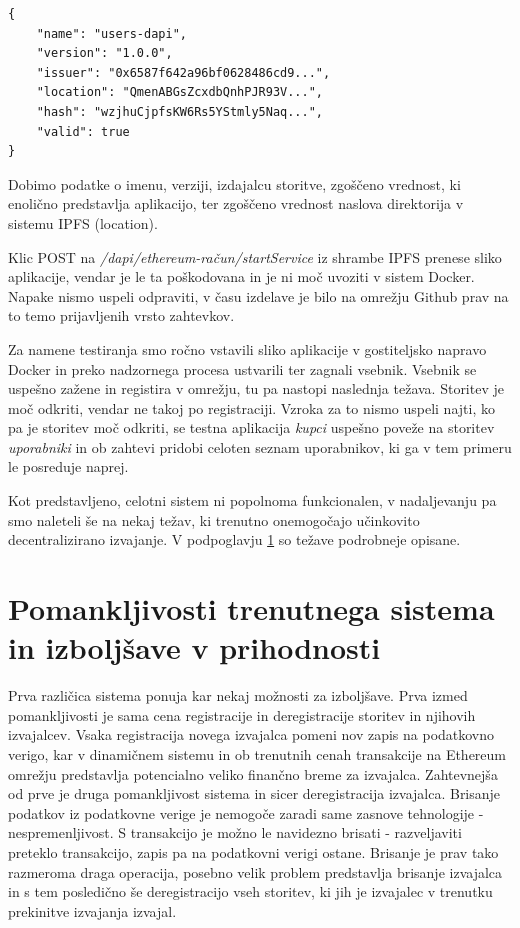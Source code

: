 \documentclass[a4paper, 12pt]{book}
\begin{document}
\begin{lstlisting}
{
	"name": "users-dapi",
	"version": "1.0.0",
	"issuer": "0x6587f642a96bf0628486cd9...",
	"location": "QmenABGsZcxdbQnhPJR93V...",
	"hash": "wzjhuCjpfsKW6Rs5YStmly5Naq...",
	"valid": true
}	
\end{lstlisting}

Dobimo podatke o imenu, verziji, izdajalcu storitve, zgoščeno vrednost, ki enolično predstavlja aplikacijo, ter zgoščeno vrednost naslova direktorija v sistemu IPFS (location).

Klic POST na \textit{/dapi/{ethereum-račun}/startService} iz shrambe IPFS prenese sliko aplikacije, vendar je le ta poškodovana in je ni moč uvoziti v sistem Docker.
Napake nismo uspeli odpraviti, v času izdelave je bilo na omrežju Github prav na to temo prijavljenih vrsto zahtevkov.

Za namene testiranja smo ročno vstavili sliko aplikacije v gostiteljsko napravo Docker in preko nadzornega procesa ustvarili ter zagnali vsebnik.
Vsebnik se uspešno zažene in registira v omrežju, tu pa nastopi naslednja težava.
Storitev je moč odkriti, vendar ne takoj po registraciji.
Vzroka za to nismo uspeli najti, ko pa je storitev moč odkriti, se testna aplikacija \textit{kupci} uspešno poveže na storitev \textit{uporabniki} in ob zahtevi pridobi celoten seznam uporabnikov, ki ga v tem primeru le posreduje naprej.

Kot predstavljeno, celotni sistem ni popolnoma funkcionalen, v nadaljevanju pa smo naleteli še na nekaj težav, ki trenutno onemogočajo učinkovito decentralizirano izvajanje.
V podpoglavju \ref{improvments} so težave podrobneje opisane.


\section{Pomankljivosti trenutnega sistema in izboljšave v prihodnosti}
\label{improvments}

Prva različica sistema ponuja kar nekaj možnosti za izboljšave.
Prva izmed pomankljivosti je sama cena registracije in deregistracije storitev in njihovih izvajalcev.
Vsaka registracija novega izvajalca pomeni nov zapis na podatkovno verigo, kar v dinamičnem sistemu in ob trenutnih cenah transakcije na Ethereum omrežju predstavlja potencialno veliko finančno breme za izvajalca.
Zahtevnejša od prve je druga pomankljivost sistema in sicer deregistracija izvajalca.
Brisanje podatkov iz podatkovne verige je nemogoče zaradi same zasnove tehnologije - nespremenljivost.
S transakcijo je možno le navidezno brisati - razveljaviti preteklo transakcijo, zapis pa na podatkovni verigi ostane.
Brisanje je prav tako razmeroma draga operacija, posebno velik problem predstavlja brisanje izvajalca in s tem posledično še deregistracijo vseh storitev, ki jih je izvajalec v trenutku prekinitve izvajanja izvajal.
\end{document}
